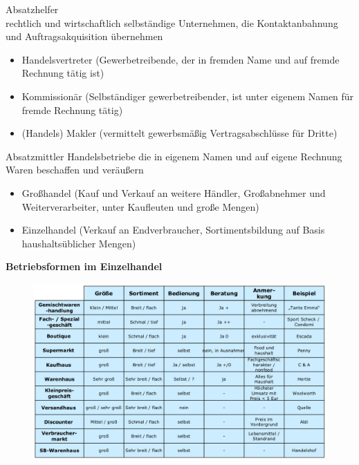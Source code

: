 \documentclass[a4paper,11pt, twoside]{article}
\begin{document}
Absatzhelfer\\
rechtlich und wirtschaftlich selbständige Unternehmen, die Kontaktanbahnung und Auftragsakquisition übernehmen
\begin{itemize}
	\item Handelsvertreter (Gewerbetreibende, der in fremden Name und auf fremde Rechnung tätig ist)
	\item Kommissionär (Selbständiger gewerbetreibender, ist unter eigenem Namen für fremde Rechnung tätig)
	\item (Handels) Makler (vermittelt gewerbsmäßig Vertragsabschlüsse für Dritte)
\end{itemize}

Absatzmittler
Handelsbetriebe die in eigenem Namen und auf eigene Rechnung Waren beschaffen und veräußern
\begin{itemize}
	\item Großhandel (Kauf und Verkauf an weitere Händler, Großabnehmer und Weiterverarbeiter, unter Kaufleuten und große Mengen)
	\item Einzelhandel (Verkauf an Endverbraucher, Sortimentsbildung auf Basis haushaltsüblicher Mengen)
\end{itemize}

\textbf{Betriebsformen im Einzelhandel}
\begin{figure}[h]
 \begin{center}
   \includegraphics[scale=0.3]{bilder/betriebsformen_einzelhandel.png}
 \end{center}
\end{figure}
\end{document}

